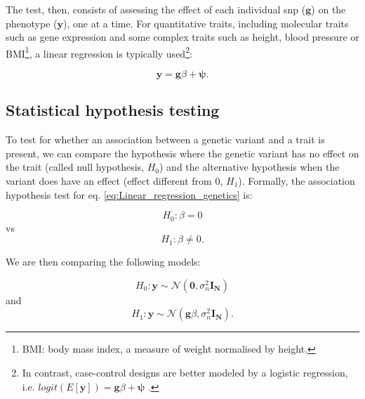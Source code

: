 The test, then, consists of assessing the effect of each individual \gls{snp} ($\mathbf{g}$) on the phenotype ($\mathbf{y}$), one at a time.
For quantitative traits, including molecular traits such as gene expression and some complex traits such as height, blood pressure or BMI\footnote{BMI: body mass index, a measure of weight normalised by height.}, a linear regression is typically used\footnote{In contrast, case-control designs are better modeled by a logistic regression, i.e. $logit(E[\mathbf{y}]) = \mathbf{g}\beta + \boldsymbol{\psi}$ \cite{chen2001general,clayton2013statistical}.}:

\begin{equation}\label{eq:Linear_regression_genetics}
 \mathbf{y} = \mathbf{g}\beta + \boldsymbol{\psi}. 
\end{equation}

\newpage

\subsection{Statistical hypothesis testing}
\label{sec:hypothesis_testing}

To test for whether an association between a genetic variant and a trait is present, we can compare the hypothesis where the genetic variant has no effect on the trait (called null hypothesis, $H_0$) and the alternative hypothesis when the variant does have an effect (effect different from $0$,  $H_1$).
Formally, the association hypothesis test for eq. \eqref{eq:Linear_regression_genetics} is:

\begin{equation}\label{eq:null_hypothesis}
 H_{0}: \beta=0 
\end{equation}
vs
\begin{equation}\label{eq:alternative_hypothesis}
 H_{1}: \beta \neq 0. 
\end{equation}

\vspace{4mm}

We are then comparing the following models:

\begin{equation}\label{eq:null_hypothesis_regression}
 H_0: \mathbf{y} \sim \mathcal{N}(\mathbf{0}, \sigma_n^{2} \mathbf{I_N}) 
\end{equation}
and
\begin{equation}\label{eq:alternative_hypothesis_regression}
 H_1: \mathbf{y} \sim \mathcal{N}(\mathbf{g}\beta,\sigma_n^{2} \mathbf{I_N}). 
\end{equation}

